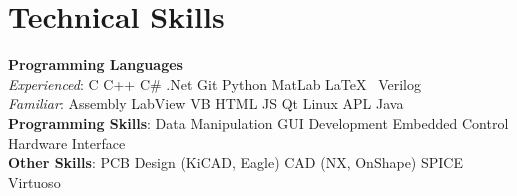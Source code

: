 \documentclass[letterpaper,11pt]{article}
\begin{document}
%

\section{Technical Skills}
 \begin{itemize}[leftmargin=0.15in, label={}]
    \small{\item{
     \textbf{Programming Languages}\\
     \quad \textit{Experienced}{: C \textbullet{}  C++ \textbullet{} C\# \textbullet{} .Net \textbullet{}	Git \textbullet{} Python \textbullet{} MatLab \textbullet{} \LaTeX\ \textbullet{} Verilog} \\
     \quad \textit{Familiar}{: Assembly \textbullet{} LabView \textbullet{} VB \textbullet{} HTML \textbullet{} JS \textbullet{} Qt \textbullet{} Linux \textbullet{} APL \textbullet{} Java} \\
     \textbf{Programming Skills}{: Data Manipulation \textbullet{} GUI Development \textbullet{} Embedded Control \textbullet{} Hardware Interface} \\
     \textbf{Other Skills}{: PCB Design (KiCAD, Eagle) \textbullet{} CAD (NX, OnShape) \textbullet{} SPICE \textbullet{} Virtuoso} \\
    }}
 \end{itemize}

			
			
\end{document}
